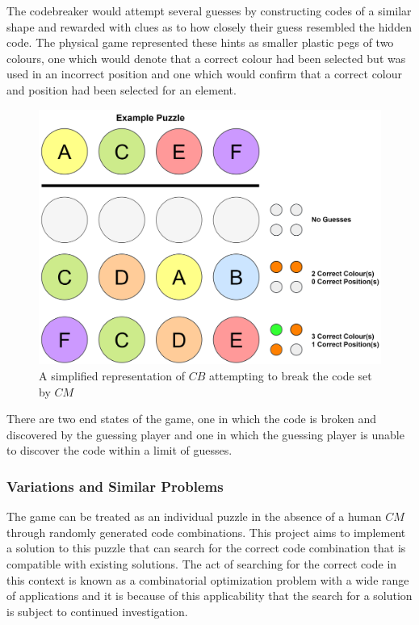 \documentclass[12pt]{article}  %
\theoremstyle{definition}
\theoremstyle{remark}
\begin{document}
The codebreaker would attempt several guesses by constructing codes of a similar shape and rewarded with clues as to how closely their guess resembled the hidden code.
The physical game represented these hints as smaller plastic pegs of two colours, one which would denote that a correct colour had been selected but was used in an incorrect
position and one which would confirm that a correct colour and position had been selected for an element.
\begin{figure}[H]
\centering
\includegraphics[scale=0.5]{guesses}
\caption{A simplified representation of $CB$ attempting to break the code set by $CM$}
\end{figure}

There are two end states of the game, one in which the code is broken and discovered by the guessing player and one in which the guessing player is unable to discover the code
within a limit of guesses.

\subsubsection {Variations and Similar Problems}





The game can be treated as an individual puzzle in the absence of a human $CM$ through randomly generated code combinations. This project aims to implement a solution to this puzzle that can search for the correct code combination that is compatible with existing solutions. The act of searching for the correct code in this context is known as a combinatorial optimization problem with a wide range of applications \cite{Haystack} and it is because of this applicability that the search for a solution is subject to continued investigation.
\end{document}
